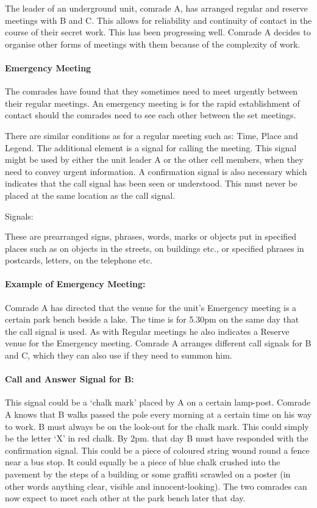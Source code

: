The leader of an underground unit, comrade A, has arranged regular and
reserve meetings with B and C. This allows for reliability and
continuity of contact in the course of their secret work. This has been
progressing well. Comrade A decides to organise other forms of meetings
with them because of the complexity of work.

\paragraph{ Emergency Meeting}

The comrades have found that they sometimes need to meet urgently
between their regular meetings. An emergency meeting is for the rapid
establishment of contact should the comrades need to see each other
between the set meetings.

There are similar conditions as for a regular meeting such as: Time,
Place and Legend. The additional element is a signal for calling the
meeting. This signal might be used by either the unit leader A or the
other cell members, when they need to convey urgent information. A
confirmation signal is also necessary which indicates that the call
signal has been seen or understood. This must never be placed at the
same location as the call signal.

{Signals:}

These are prearranged signs, phrases, words, marks or objects put in
specified places such as on objects in the streets, on buildings etc.,
or specified phrases in postcards, letters, on the telephone etc.

\paragraph{Example of Emergency Meeting:}

Comrade A has directed that the venue for the unit's Emergency meeting
is a certain park bench beside a lake. The time is for 5.30pm on the
same day that the call signal is used. As with Regular meetings he also
indicates a Reserve venue for the Emergency meeting. Comrade A arranges
different call signals for B and C, which they can also use if they need
to summon him.

\paragraph{Call and Answer Signal for B:}

This signal could be a `chalk mark' placed by A on a certain lamp-post.
Comrade A knows that B walks passed the pole every morning at a certain
time on his way to work. B must always be on the look-out for the chalk
mark. This could simply be the letter `X' in red chalk. By 2pm. that day
B must have responded with the confirmation signal. This could be a
piece of coloured string wound round a fence near a bus stop. It could
equally be a piece of blue chalk crushed into the pavement by the steps
of a building or some graffiti scrawled on a poster (in other words
anything clear, visible and innocent-looking). The two comrades can now
expect to meet each other at the park bench later that day.

